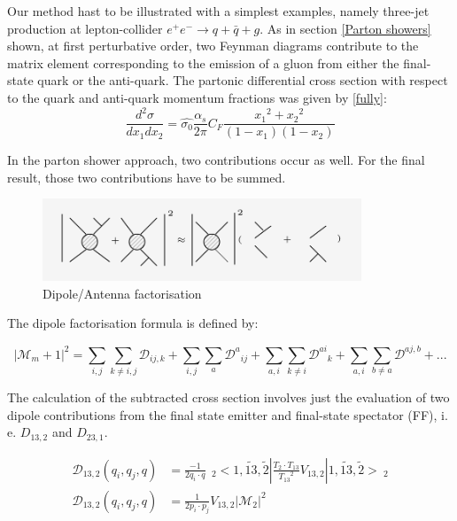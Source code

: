 Our method hast to be illustrated with a simplest examples, namely three-jet production at lepton-collider $ e^+ e^- \rightarrow q + \bar{q} + g $. As in section \ref{Parton showers} shown, at first perturbative order, two Feynman diagrams contribute to the matrix element corresponding to the emission of a gluon from either the final-state quark or the anti-quark. The partonic differential cross section with respect to the quark and anti-quark momentum fractions was given by \ref{fully}:
\begin{equation}
\frac{d^2 \sigma}{dx_1 dx_2}= \hat{\sigma_0}
\frac{\alpha_s}{2\pi} C_F \frac{{x_1}^2+{x_2}^2}{(1-x_1)(1-x_2)}
\label{confi}
\end{equation}

In the parton shower approach, two contributions occur as well. For the final result, those two contributions have to be summed. 

\begin{figure}[h!]
\centering
\includegraphics[width=0.85\textwidth]{images/Intro/factorization.png}
\caption{Dipole/Antenna factorisation}
\end{figure}


The dipole factorisation formula is defined by:

 \begin{equation}
 |\mathcal{M}_m+1|^2 = \displaystyle\sum\limits_{i,j} \displaystyle\sum\limits_{k\neq i,j} \mathcal{D}_{ij,k} +\displaystyle\sum\limits_{i,j} \displaystyle\sum\limits_{a} {\mathcal{D}^a}_{ij}+\displaystyle\sum\limits_{a,i} \displaystyle\sum\limits_{k\neq i} {\mathcal{D}^{ai}}_{k}+\displaystyle\sum\limits_{a,i} \displaystyle\sum\limits_{b\neq a} \mathcal{D}^{aj,b}+...
 \end{equation}
 
The calculation of the subtracted cross section involves just the evaluation of two dipole contributions from the final state emitter and final-state spectator (FF), i. e. $ D_{13,2} $ and $ D_{23,1} $. 

\begin{equation}
\begin{split}
\mathcal{D}_{13,2} (q_i,q_j,q)&= \frac{-1}{2q_i \cdot q} \:\:_2<1,\tilde{13},\tilde{2} |\frac{T_2 \cdot T_{13}}{{T_{13}}^2} V_{13,2}| 1,\tilde{13},\tilde{2} >\:_2\\
\mathcal{D}_{13,2} (q_i,q_j,q)&=\frac{1}{2p_i \cdot p_j} V_{13,2} |\mathcal{M}_{2}|^2
\end{split}
\end{equation}



